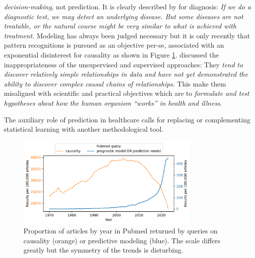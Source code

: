 \documentclass[french,12pt,twoside,a4paper]{book}
\begin{document}
\begin{background_box_left}
  \textit{decision-making}, not prediction. It is clearly described by
  \cite{steyerberg2009applications} for diagnosis: \textit{If we do a diagnostic
    test, we may detect an underlying disease. But some diseases are not
    treatable, or the natural course might be very similar to what is achieved
    with treatment.} Modeling has always been judged necessary but it is only
  recently that pattern recognitions is pursued as an objective per-se,
  associated with an exponential disinterest for causality as shown in Figure
  \ref{fig:intro:pubmed_query}. \cite{patel2009coming} discussed the
  inappropriateness of the unsupervised and supervised approaches: They
  \textit{tend to discover relatively simple relationships in data and have not
    yet demonstrated the ability to discover complex causal chains of
    relationships.} This make them misaligned with scientific and practical
  objectives which are to \textit{formulate and test hypotheses about how the
    human organism “works” in health and illness}.

  The auxiliary role of prediction in healthcare calls for replacing or
  complementing statistical learning with another methodological tool.


\end{background_box_left}

\begin{figure}
  \centering
  \includegraphics[width=0.8\textwidth]{img/chapter_1/pubmed_query.pdf}
  \caption{Proportion of articles by year in Pubmed returned by queries on
    causality (orange) or predictive modeling (blue). The scale differs greatly
    but the symmetry of the trends is disturbing.}%
  \label{fig:intro:pubmed_query}
\end{figure}
\end{document}
